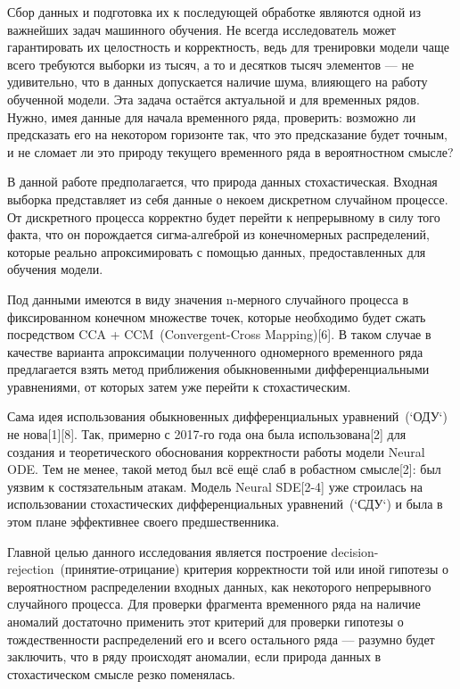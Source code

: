 \documentclass{article}
\begin{document}
   \par Сбор данных и подготовка их к последующей обработке являются одной из важнейших задач машинного обучения. Не всегда исследователь может гарантировать их целостность и корректность, ведь для тренировки модели чаще всего требуются выборки из тысяч, а то и десятков тысяч элементов --- не удивительно, что в данных допускается наличие шума, влияющего на работу обученной модели. Эта задача остаётся актуальной и для временных рядов. Нужно, имея данные для начала временного ряда, проверить: возможно ли предсказать его на некотором горизонте так, что это предсказание будет точным, и не сломает ли это природу текущего временного ряда в вероятностном смысле?
   \par В данной работе предполагается, что природа данных стохастическая. Входная выборка представляет из себя данные о некоем дискретном случайном процессе. От дискретного процесса корректно будет перейти к непрерывному в силу того факта, что он порождается сигма-алгеброй из конечномерных распределений, которые реально апроксимировать с помощью данных, предоставленных для обучения модели.
   \par Под данными имеются в виду значения n-мерного случайного процесса в фиксированном конечном множестве точек, которые необходимо будет сжать посредством CCA + CCM~(Convergent-Cross Mapping)[6]. В таком случае в качестве варианта апроксимации полученного одномерного временного ряда предлагается взять метод приближения обыкновенными дифференциальными уравнениями, от которых затем уже перейти к стохастическим.
   \par Сама идея использования обыкновенных дифференциальных уравнений~(`ОДУ`) не нова[1][8]. Так, примерно с 2017-го года она была использована[2] для создания и теоретического обоснования корректности работы модели Neural ODE. Тем не менее, такой метод был всё ещё слаб в робастном смысле[2]: был уязвим к состязательным атакам. Модель Neural SDE[2-4] уже строилась на использовании стохастических дифференциальных уравнений~(`СДУ`) и была в этом плане эффективнее своего предшественника.
   \par Главной целью данного исследования является построение decision-rejection~(принятие-отрицание) критерия корректности той или иной гипотезы о вероятностном распределении входных данных, как некоторого непрерывного случайного процесса. Для проверки фрагмента временного ряда на наличие аномалий достаточно применить этот критерий для проверки гипотезы о тождественности распределений его и всего остального ряда --- разумно будет заключить, что в ряду происходят аномалии, если природа данных в стохастическом смысле резко поменялась.
\end{document}
